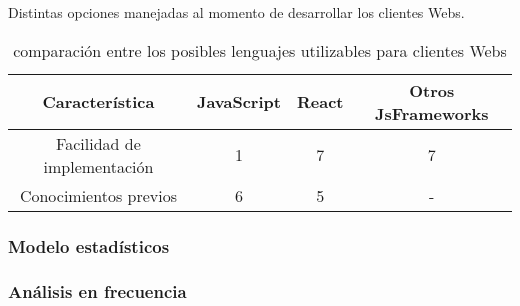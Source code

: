     \begin{table}[ht]
        \begin{center}
            Distintas opciones manejadas al momento de desarrollar los clientes Webs.\\

            \vspace{0.3cm}
            \begin{tabular}{|c|c|c|c|}
                \hline
                Característica              & JavaScript & React & Otros JsFrameworks\\\hline
                Facilidad de implementación & 1         & 7     &  7\\\hline
                Conocimientos previos       & 6         & 5     &  - \\\hline
            \end{tabular}
        \end{center}
        \caption[Comparativa de posibles lenguajes nivel cliente Web]{comparación entre
        los posibles lenguajes utilizables para clientes Webs}
        \label{tab:LenguajesCliente}
    \end{table}



    \subsubsection{Modelo estadísticos}

    \subsubsection{Análisis en frecuencia}


